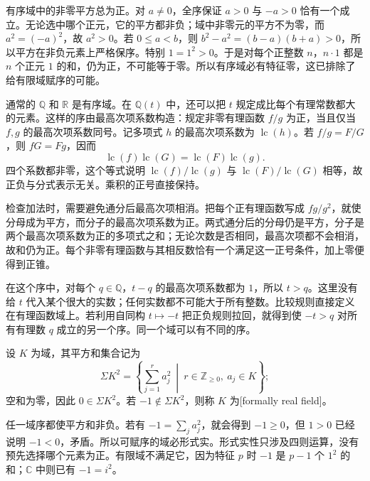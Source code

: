 \ProseParagraphBreak
有序域中的非零平方总为正。对 \(a\neq0\)，全序保证 \(a>0\) 与 \(-a>0\) 恰有一个成立。无论选中哪个正元，它的平方都非负；域中非零元的平方不为零，而 \(a^2=(-a)^2\)，故 \(a^2>0\)。若 \(0\leq a<b\)，则 \(b^2-a^2=(b-a)(b+a)>0\)，所以平方在非负元素上严格保序。特别 \(1=1^2>0\)。于是对每个正整数 \(n\)，\(n\cdot1\) 都是 \(n\) 个正元 \(1\) 的和，仍为正，不可能等于零。所以有序域必有特征零，这已排除了给有限域赋序的可能。

\ProseParagraphBreak
通常的 \(\mathbb Q\) 和 \(\mathbb R\) 是有序域。在 \(\mathbb Q(t)\) 中，还可以把 \(t\) 规定成比每个有理常数都大的元素。这样的序由最高次项系数构造：规定非零有理函数 \(f/g\) 为正，当且仅当 \(f,g\) 的最高次项系数同号。记多项式 \(h\) 的最高次项系数为 \(\operatorname{lc}(h)\)。若 \(f/g=F/G\)，则 \(fG=Fg\)，因而
\[
	\operatorname{lc}(f)\operatorname{lc}(G) =\operatorname{lc}(F)\operatorname{lc}(g).
\]
四个系数都非零，这个等式说明 \(\operatorname{lc}(f)/\operatorname{lc}(g)\) 与 \(\operatorname{lc}(F)/\operatorname{lc}(G)\) 相等，故正负与分式表示无关。乘积的正号直接保持。

\ProseParagraphBreak
检查加法时，需要避免通分后最高次项相消。把每个正有理函数写成 \(fg/g^2\)，就使分母成为平方，而分子的最高次项系数为正。两式通分后的分母仍是平方，分子是两个最高次项系数为正的多项式之和；无论次数是否相同，最高次项都不会相消，故和仍为正。每个非零有理函数与其相反数恰有一个满足这一正号条件，加上零便得到正锥。

\ProseParagraphBreak
在这个序中，对每个 \(q\in\mathbb Q\)，\(t-q\) 的最高次项系数都为 \(1\)，所以 \(t>q\)。这里没有给 \(t\) 代入某个很大的实数；任何实数都不可能大于所有整数。比较规则直接定义在有理函数域上。若利用自同构 \(t\mapsto-t\) 把正负规则拉回，就得到使 \(-t>q\) 对所有有理数 \(q\) 成立的另一个序。同一个域可以有不同的序。

\begin{definition}\label{b1:def:sum-of-squares}
	设 \(K\) 为域，其平方和集合记为
	\[
		\Sigma K^2=\left\{\sum_{j=1}^r a_j^2\ \middle|\ r\in\mathbb Z_{\geq0},\ a_j\in K\right\};
	\]
	空和为零，因此 \(0\in\Sigma K^2\)。若 \(-1\notin\Sigma K^2\)，则称 \(K\) 为[formally real field]。
\end{definition}


任一域序都使平方和非负。若有 \(-1=\sum_j a_j^2\)，就会得到 \(-1\geq0\)，但 \(1>0\) 已经说明 \(-1<0\)，矛盾。所以可赋序的域必形式实。形式实性只涉及四则运算，没有预先选择哪个元素为正。有限域不满足它，因为特征 \(p\) 时 \(-1\) 是 \(p-1\) 个 \(1^2\) 的和；\(\mathbb C\) 中则已有 \(-1=i^2\)。

